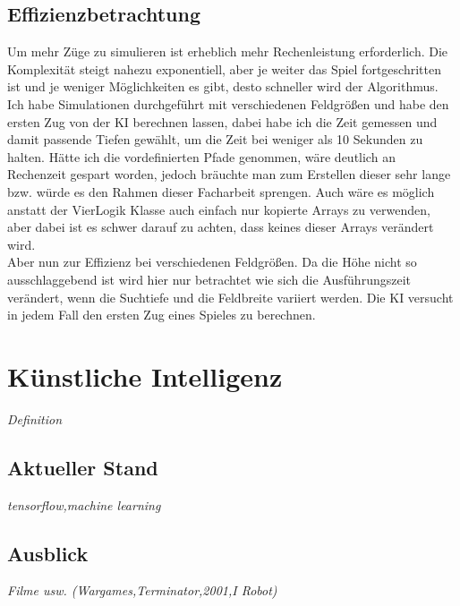 \documentclass[12pt,a4paper,ngerman]{article}
\begin{document}
	\subsection{Effizienzbetrachtung}
	Um mehr Züge zu simulieren ist erheblich mehr Rechenleistung erforderlich. Die Komplexität steigt nahezu exponentiell, aber je weiter das Spiel fortgeschritten ist und je weniger Möglichkeiten es gibt, desto schneller wird der Algorithmus. Ich habe Simulationen durchgeführt mit verschiedenen Feldgrößen und habe den ersten Zug von der KI berechnen lassen, dabei habe ich die Zeit gemessen und damit passende Tiefen gewählt, um die Zeit bei weniger als 10 Sekunden zu halten. Hätte ich die vordefinierten Pfade genommen, wäre deutlich an Rechenzeit gespart worden, jedoch bräuchte man zum Erstellen dieser sehr lange bzw. würde es den Rahmen dieser Facharbeit sprengen. Auch wäre es möglich anstatt der VierLogik Klasse auch einfach nur kopierte Arrays zu verwenden, aber dabei ist es schwer darauf zu achten, dass keines dieser Arrays verändert wird.\\
	Aber nun zur Effizienz bei verschiedenen Feldgrößen. Da die Höhe nicht so ausschlaggebend ist wird hier nur betrachtet wie sich die Ausführungszeit verändert, wenn die Suchtiefe und die Feldbreite variiert werden. Die KI versucht in jedem Fall den ersten Zug eines Spieles zu berechnen.
	
		\centering
	
	\section{Künstliche Intelligenz}
	\textit{Definition}
	\subsection{Aktueller Stand}
	\textit{tensorflow,machine learning}
	\subsection{Ausblick}
	\textit{Filme usw. (Wargames,Terminator,2001,I Robot)}
	
\end{document}
